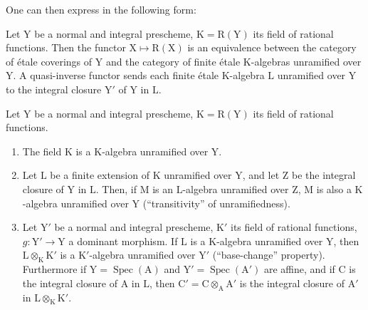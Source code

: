 One can then express  in the following form:

\begin{corollary}[18.10.12]
\label{IV.18.10.12}
Let $\mathrm{Y}$ be a normal and integral prescheme, $\mathrm{K}=\mathrm{R}(\mathrm{Y})$ its field of rational functions.
Then the functor $\mathrm{X}\mapsto\mathrm{R}(\mathrm{X})$ is an equivalence between the category of \'etale coverings of $\mathrm{Y}$ and the category of finite \'etale $\mathrm{K}$-algebras unramified over $\mathrm{Y}$.
A quasi-inverse functor sends each finite \'etale $\mathrm{K}$-algebra $\mathrm{L}$ unramified over $\mathrm{Y}$ to the integral closure $\mathrm{Y}'$ of $\mathrm{Y}$ in $\mathrm{L}$.
\end{corollary}

\begin{proposition}[18.10.13]
\label{IV.18.10.13}
Let $\mathrm{Y}$ be a normal and integral prescheme, $\mathrm{K}=\mathrm{R}(\mathrm{Y})$ its field of rational functions.
\begin{enumerate}[label=(\roman*)]
  \item The field $\mathrm{K}$ is a $\mathrm{K}$-algebra unramified over $\mathrm{Y}$.
  \item Let $\mathrm{L}$ be a finite extension of $\mathrm{K}$ unramified over $\mathrm{Y}$, and let $\mathrm{Z}$ be the integral closure of $\mathrm{Y}$ in $\mathrm{L}$.
Then, if $\mathrm{M}$ is an $\mathrm{L}$-algebra unramified over $\mathrm{Z}$, $\mathrm{M}$ is also a $\mathrm{K}$-algebra unramified over $\mathrm{Y}$ (``transitivity'' of unramifiedness).
  \item Let $\mathrm{Y}'$ be a normal and integral prescheme, $\mathrm{K}'$ its field of rational functions, $g:\mathrm{Y}'\to\mathrm{Y}$ a dominant morphism.
If $\mathrm{L}$ is a $\mathrm{K}$-algebra unramified over $\mathrm{Y}$, then $\mathrm{L}\otimes_{\mathrm{K}}\mathrm{K}'$ is a $\mathrm{K}'$-algebra unramified over $\mathrm{Y}'$ (``base-change'' property).
Furthermore if $\mathrm{Y}=\operatorname{Spec}(\mathrm{A})$ and $\mathrm{Y}'=\operatorname{Spec}(\mathrm{A}')$ are affine, and if $\mathrm{C}$ is the integral closure of $\mathrm{A}$ in $\mathrm{L}$, then $\mathrm{C}'=\mathrm{C}\otimes_{\mathrm{A}}\mathrm{A}'$ is the integral closure of $\mathrm{A}'$ in $\mathrm{L}\otimes_{\mathrm{K}}\mathrm{K}'$.
\end{enumerate}
\end{proposition}


